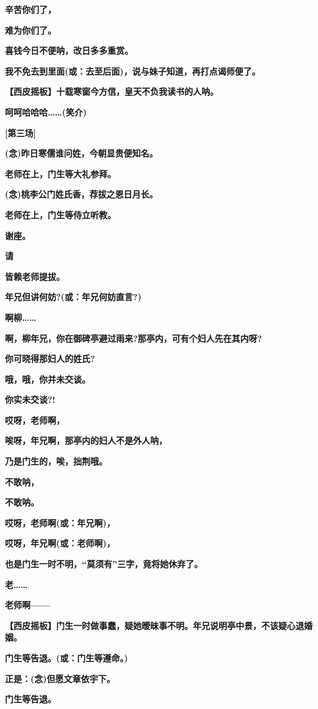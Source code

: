 \textbf{辛苦你们了，}

\textbf{难为你们了。}

\textbf{喜钱今日不便呐，改日多多重赏。}

\textbf{我不免去到里面(或：去至后面)，说与妹子知道，再打点谒师便了。}

\textbf{【西皮摇板】十载寒窗今方信，皇天不负我读书的人呐。}

\textbf{呵呵哈哈哈\ldots{}\ldots{}(笑介)}

\textbf{{[}第三场{]}}

\textbf{(念)昨日寒儒谁问姓，今朝显贵便知名。}

\textbf{老师在上，门生等大礼参拜。}

\textbf{(念)桃李公门姓氏香，荐拔之恩日月长。}

\textbf{老师在上，门生等侍立听教。}

\textbf{谢座。}

\textbf{请}

\textbf{皆赖老师提拔。}

\textbf{年兄但讲何妨?(或：年兄何妨直言?)}

\textbf{啊柳\ldots{}\ldots{}}

\textbf{啊，柳年兄，你在御碑亭避过雨来?那亭内，可有个妇人先在其内呀?}

\textbf{你可晓得那妇人的姓氏?}

\textbf{哦，哦，你并未交谈。}

\textbf{你实未交谈?!}

\textbf{哎呀，老师啊，}

\textbf{唉呀，年兄啊，那亭内的妇人不是外人呐，}

\textbf{乃是门生的，唉，拙荆哦。}

\textbf{不敢呐，}

\textbf{不敢呐。}

\textbf{哎呀，老师啊(或：年兄啊)，}

\textbf{哎呀，年兄啊(或：老师啊)，}

\textbf{也是门生一时不明，``莫须有''三字，竟将她休弃了。}

\textbf{老\ldots{}\ldots{}}

\textbf{老师啊------}

\textbf{【西皮摇板】门生一时做事蠢，疑她暧昧事不明。年兄说明亭中景，不该疑心退婚姻。}

\textbf{门生等告退。(或：门生等遵命。)}

\textbf{正是：(念)但愿文章依宇下。}

\textbf{门生等告退。}

